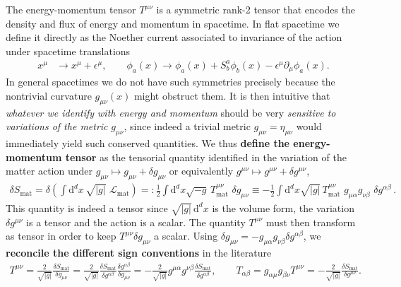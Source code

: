 \documentclass[../geometry_main.tex]{subfiles}
\begin{document}
\begin{mytheorem}
The energy-momentum tensor $T^{\mu\nu}$ is a symmetric rank-2 tensor that encodes the density and flux of energy and momentum in spacetime.
In flat spacetime we define it directly as the Noether current associated to invariance of the action under spacetime translations 
\begin{align}
    x^\mu &\to x^\mu + \epsilon^\mu,\qquad \phi_a(x) \to \phi_a(x) + S^a_b \phi_b(x)- \epsilon^\mu \partial_\mu \phi_a(x).
\end{align}
%
In general spacetimes we do not have such symmetries precisely because the nontrivial curvature $g_{\mu\nu}(x)$ might obstruct them.
It is then intuitive that \emph{whatever we identify with energy and momentum} should be very \emph{sensitive to variations of the metric} $g_{\mu\nu}$, since indeed a trivial metric $g_{\mu\nu}=\eta_{\mu\nu}$ would immediately yield such conserved quantities.
We thus \textbf{define the energy-momentum tensor} as the tensorial quantity identified in the variation of the matter action under $g_{\mu\nu}\mapsto g_{\mu\nu} + \delta g_{\mu\nu}$ or equivalently $g^{\mu\nu} \mapsto g^{\mu\nu} + \delta g^{\mu\nu}$,
\begin{align}
    \delta S_\text{mat} = \delta \left(\int \mathrm{d}^dx\,\sqrt{|g|}\,\,\mathcal{L}_\text{mat}\right)
    =: \frac{1}{2} \int \mathrm{d}^d x \sqrt{-g}\, T^{\mu\nu}_\text{mat}\,\,\delta g_{\mu\nu}
    \equiv - \frac{1}{2} \int \mathrm{d}^d x \sqrt{|g|}\, T^{\mu\nu}_\text{mat} \,\,g_{\mu\alpha} g_{\nu\beta} \,\,\delta g^{\alpha\beta}\,.
\end{align}
This quantity is indeed a tensor since $\sqrt{|g|}\,\mathrm{d}^d x $ is the volume form, the variation $\delta g^{\mu\nu}$ is a tensor and the action is a scalar.
The quantity $T^{\mu\nu}$ must then transform as tensor in order to keep $T^{\mu\nu} \delta g_{\mu\nu}$ a scalar.
%
Using $\delta g_{\mu\nu} = - g_{\mu\alpha} g_{\nu\beta} \delta g^{\alpha\beta}$, we \textbf{reconcile the different sign conventions} in the literature
{\small
\begin{align}
    T^{\mu\nu} = \frac{2}{\sqrt{|g|}} \frac{\delta S_\text{mat}}{\delta g_{\mu\nu}}
    = \frac{2}{\sqrt{|g|}} \frac{\delta S_\text{mat}}{\delta g^{\alpha\beta}} \frac{\delta g^{\alpha\beta}}{\delta g_{\mu\nu}}
    = - \frac{2}{\sqrt{|g|}} g^{\mu\alpha} g^{\nu\beta} \frac{\delta S_\text{mat}}{\delta g^{\alpha\beta}}
    ,\qquad
    T_{\alpha\beta} = g_{\alpha\mu} g_{\beta\nu} T^{\mu\nu}
    = -\frac{2}{\sqrt{|g|}} \frac{\delta S_\text{mat}}{\delta g^{\mu\nu}}.
\end{align}
}


\end{mytheorem}
\end{document}
